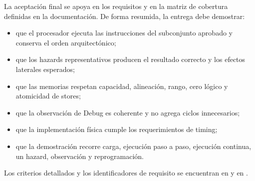 La aceptación final se apoya en los requisitos y en la matriz de
cobertura definidas en la documentación. De forma resumida, la
entrega debe demostrar:

\begin{itemize}
  \item que el procesador ejecuta las instrucciones del subconjunto aprobado y
    conserva el orden arquitectónico;
  \item que los hazards representativos producen el resultado correcto y los
    efectos laterales esperados;
  \item que las memorias respetan capacidad, alineación, rango, cero lógico y
    atomicidad de stores;
  \item que la observación de Debug es coherente y no agrega ciclos
    innecesarios;
  \item que la implementación física cumple los requerimientos de timing;
  \item que la demostración recorre carga, ejecución paso a paso,
    ejecución continua, un hazard, observación y reprogramación.
\end{itemize}

Los criterios detallados y los identificadores de requisito se
encuentran en 
y en .

